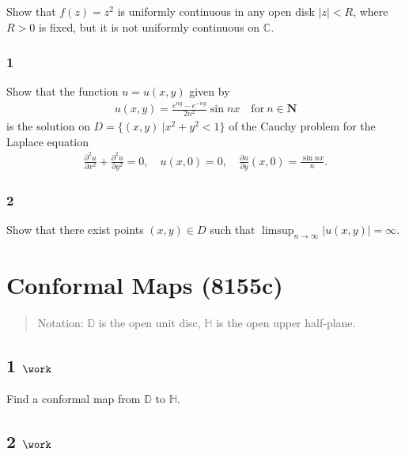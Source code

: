 Show that \(f(z) = z^2\) is uniformly continuous in any open disk
\(|z| < R\), where \(R>0\) is fixed, but it is not uniformly continuous
on \(\mathbb C\).

\hypertarget{section-2}{%
\subsubsection{1}\label{section-2}}

Show that the function \(u=u(x,y)\) given by
\begin{align*}
u(x,y)=\frac{e^{ny}-e^{-ny}}{2n^2}\sin nx\quad \text{for}\ n\in {\mathbf N}
\end{align*}
is the solution on \(D=\{(x,y)\ | x^2+y^2<1\}\) of the Cauchy problem
for the Laplace equation
\begin{align*}\frac{\partial ^2u}{\partial x^2}+\frac{\partial ^2u}{\partial y^2}=0,\quad
u(x,0)=0,\quad \frac{\partial u}{\partial y}(x,0)=\frac{\sin nx}{n}.\end{align*}

\hypertarget{section-3}{%
\subsubsection{2}\label{section-3}}

Show that there exist points \((x,y)\in D\) such that
\(\displaystyle{\limsup_{n\to\infty} |u(x,y)|=\infty}\).

\hypertarget{conformal-maps-8155c}{%
\section{Conformal Maps (8155c)}\label{conformal-maps-8155c}}

\begin{quote}
Notation: \({\mathbb{D}}\) is the open unit disc, \({\mathbb{H}}\) is
the open upper half-plane.
\end{quote}

\hypertarget{work-16}{%
\subsection{\texorpdfstring{1
\(\work\)}{1 \textbackslash work}}\label{work-16}}

Find a conformal map from \({\mathbb{D}}\) to \({\mathbb{H}}\).

\hypertarget{work-17}{%
\subsection{\texorpdfstring{2
\(\work\)}{2 \textbackslash work}}\label{work-17}}

